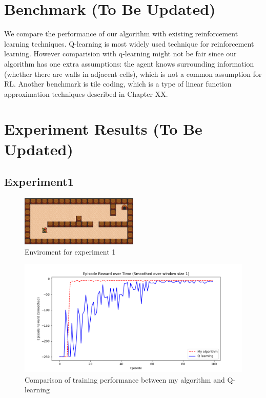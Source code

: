 \section{Benchmark (To Be Updated)}

We compare the performance of our algorithm with existing reinforcement learning techniques. 
Q-learning is most widely used technique for reinforcement learning. However comparision with q-learning might not be fair 
since our algorithm has one extra assumptions: the agent knows surrounding information (whether there are walls in adjacent cells), 
which is not a common assumption for RL.
Another benchmark is tile coding, which is a type of linear function approximation techniques described in Chapter XX. 

\section{Experiment Results (To Be Updated)}
\label{learning_evaluation}

\subsection{Experiment1}

\begin{figure}[!htb]
\centering
\includegraphics[width=0.5\textwidth]{./figures/experiment1}
\caption{Enviroment for experiment 1}
\label{experiment1}
\end{figure}
    

\begin{figure}[!htb]
\centering
\includegraphics[width=1.0\textwidth]{./figures/experiment1_training}
\caption{Comparison of training performance between my algorithm and Q-learning}
\label{experiment1_training}
\end{figure}


